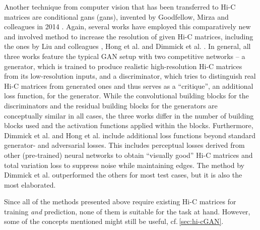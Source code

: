 Another technique from computer vision that has been transferred to Hi-C matrices are conditional \acrlong{gan}s (\acrshort{gan}s), 
invented by Goodfellow, Mirza and colleagues in 2014 \cite{Goodfellow2014, mirza2014}. 
Again, several works have employed this comparatively new and involved method to increase the resolution of given Hi-C matrices, 
including the ones by Liu and colleagues \cite{Liu2019}, Hong et al. \cite{Hong2020} and Dimmick et al. \cite{Dimmick2020}.
In general, all three works feature the typical GAN setup with two competitive networks -- a generator, 
which is trained to produce realistic high-resolution Hi-C matrices from its low-resolution inputs, 
and a discriminator, which tries to distinguish real Hi-C matrices from generated ones and thus serves as a ``critique'', an additional loss function, for the generator.
While the convolutional building blocks for the discriminators and the residual building blocks for the generators are conceptually similar
in all cases, the three works differ in the number of building blocks used and the activation functions applied within the blocks.
Furthermore, Dimmick et al. and Hong et al. include additional loss functions beyond standard generator- and adversarial losses. 
This includes perceptual losses derived from other (pre-trained) neural networks to obtain ``visually good'' Hi-C matrices and total variation loss to suppress noise
while maintaining edges. 
The method by Dimmick et al. outperformed the others for most test cases, but it is also the most elaborated.

Since all of the methods presented above require existing Hi-C matrices for training \emph{and} prediction, none of them is suitable for the task at hand.
However, some of the concepts mentioned might still be useful, cf.\,\cref{sec:hi-cGAN}.



